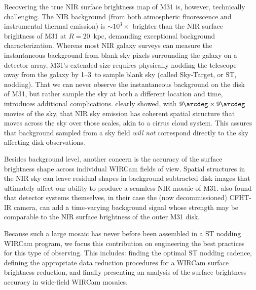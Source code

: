 \documentclass[iop,tighten]{emulateapj}
\begin{document}
Recovering the true NIR surface brightness map of M31 is, however, technically challenging.
The NIR background (from both atmospheric fluorescence and instrumental thermal emission) is $\sim 10^3\times$ brighter than the NIR surface brightness of M31 at $R=20$~kpc, demanding exceptional background characterization.
Whereas most NIR galaxy surveys can measure the instantaneous background from blank sky pixels surrounding the galaxy on a detector array, M31's extended size requires physically nodding the telescope away from the galaxy by 1\arcdeg--3\arcdeg\ to sample blank sky (called Sky-Target, or ST, nodding).
That we can never observe the instantaneous background on the disk of M31, but rather sample the sky at both a different location and time, introduces additional complications.
\cite{Adams:1996} clearly showed, with $9\arcdeg \times 9\arcdeg$ movies of the sky, that NIR sky emission has coherent spatial structure that moves across the sky over those scales, akin to a cirrus cloud system.
This assures that background sampled from a sky field \emph{will not} correspond directly to the sky affecting disk observations.

Besides background level, another concern is the accuracy of the surface brightness shape across individual WIRCam fields of view.
Spatial structures in the NIR sky can leave residual shapes in background subtracted disk images that ultimately affect our ability to produce a seamless NIR mosaic of M31.
\cite{Vaduvescu:2004} also found that detector systems themselves, in their case the (now decommissioned) CFHT-IR camera, can add a time-varying background signal whose strength may be comparable to the NIR surface brightness of the outer M31 disk.

Because such a large mosaic has never before been assembled in a ST nodding WIRCam program, we focus this contribution on engineering the best practices for this type of observing.
This includes: finding the optimal ST nodding cadence, defining the appropriate data reduction procedures for a WIRCam surface brightness reduction, and finally presenting an analysis of the surface brightness accuracy in wide-field WIRCam mosaics.
\end{document}
